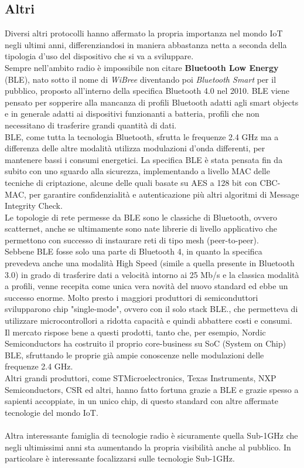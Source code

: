 \subsection{Altri}
Diversi altri protocolli hanno affermato la propria importanza nel mondo IoT negli ultimi anni, differenziandosi in maniera abbastanza netta a seconda della tipologia d'uso del dispositivo che si va a sviluppare.
\\Sempre nell'ambito radio è impossibile non citare \textbf{Bluetooth Low Energy} (BLE), nato sotto il nome di \textit{WiBree} diventando poi \textit{Bluetooth Smart} per il pubblico, proposto all'interno della specifica Bluetooth 4.0 nel 2010. BLE viene pensato per sopperire alla mancanza di profili Bluetooth adatti agli smart objects e in generale adatti ai dispositivi funzionanti a batteria, profili che non necessitano di trasferire grandi quantità di dati.
\\BLE, come tutta la tecnologia Bluetooth, sfrutta le frequenze 2.4 GHz ma a differenza delle altre modalità utilizza modulazioni d'onda differenti, per mantenere bassi i consumi energetici. La specifica BLE è stata pensata fin da subito con uno sguardo alla sicurezza, implementando a livello MAC delle tecniche di criptazione, alcune delle quali basate su AES a 128 bit con CBC-MAC, per garantire confidenzialità e autenticazione più altri algoritmi di Message Integrity Check.\\Le topologie di rete permesse da BLE sono le classiche di Bluetooth, ovvero scatternet, anche se ultimamente sono nate librerie di livello applicativo che permettono con successo di instaurare reti di tipo mesh (peer-to-peer). \\Sebbene BLE fosse solo una parte di Bluetooth 4, in quanto la specifica prevedeva anche una modalità High Speed (simile a quella presente in Bluetooth 3.0) in grado di trasferire dati a velocità intorno ai 25 Mb/s e la classica modalità a profili, venne recepita come unica vera novità del nuovo standard ed ebbe un successo enorme. Molto presto i maggiori produttori di semiconduttori svilupparono chip "single-mode", ovvero con il solo stack BLE., che permetteva di utilizzare microcontrollori a ridotta capacità e quindi abbattere costi e consumi. Il mercato rispose bene a questi prodotti, tanto che, per esempio, Nordic Semiconductors ha costruito il proprio core-business su SoC (System on Chip) BLE, sfruttando le proprie già ampie conoscenze nelle modulazioni delle frequenze 2.4 GHz. \\Altri grandi produttori, come STMicroelectronics, Texas Instruments, NXP Semiconductors, CSR ed altri, hanno fatto fortuna grazie a BLE e grazie spesso a sapienti accoppiate, in un unico chip, di questo standard con altre affermate tecnologie del mondo IoT.
\\\\Altra interessante famiglia di tecnologie radio è sicuramente quella Sub-1GHz che negli ultimissimi anni sta aumentando la propria visibilità anche al pubblico. In particolare è interessante focalizzarsi sulle tecnologie Sub-1GHz.

